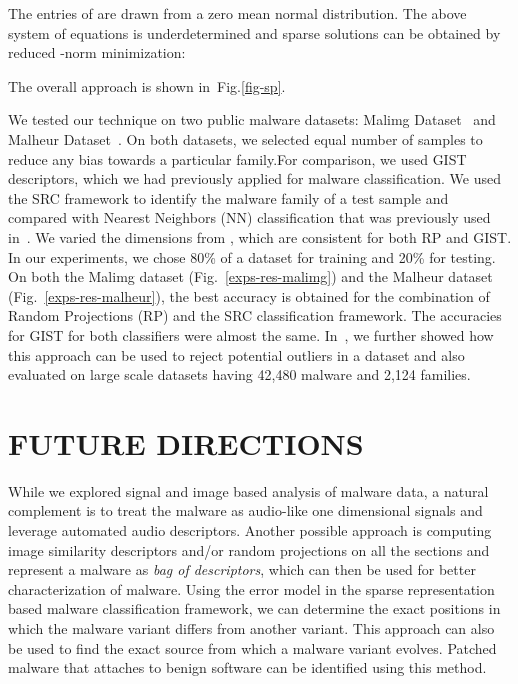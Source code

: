 \documentclass[journal]{IEEEtran}
\begin{document}
 
The entries of  are drawn from a zero mean normal distribution.
The above system of equations is underdetermined and sparse solutions can be obtained by reduced -norm minimization:


The overall approach is shown in~Fig.\ref{fig-sp}.



We tested our technique on two public malware datasets: Malimg Dataset~\cite{malimg-ds} and Malheur Dataset~\cite{malheur}.
On both datasets, we selected equal number of samples to reduce any bias towards a particular family.For comparison, we used GIST descriptors, which we had previously applied for malware classification.
We used the SRC framework to identify the malware family of a test sample and compared with Nearest Neighbors (NN) classification that was previously used in~\cite{malw-imgs}.
We varied the dimensions from , which are consistent for both RP and GIST.
In our experiments, we chose 80\% of a dataset for training and 20\% for testing. 
On both the Malimg dataset (Fig.~\ref{exps-res-malimg}) and the Malheur dataset (Fig.~\ref{exps-res-malheur}), the best accuracy is obtained for the combination of Random Projections (RP) and the SRC classification framework.
The accuracies for GIST for both classifiers were almost the same.
In~\cite{sattva}, we further showed how this approach can be used to reject potential outliers in a dataset and also evaluated on large scale datasets having 42,480 malware and 2,124 families.







\section*{FUTURE DIRECTIONS}
While we explored signal and image based analysis of malware data, a natural complement is to treat the malware as audio-like one dimensional signals and leverage automated audio descriptors.
Another possible approach is computing image similarity descriptors and/or random projections on all the sections and represent a malware as \emph{bag of descriptors}, which can then be used for better characterization of malware.
Using the error model in the sparse representation based malware classification framework, we can determine the exact positions in which the malware variant differs from another variant.
This approach can also be used to find the exact source from which a malware variant evolves.
Patched malware that attaches to benign software can be identified using this method.
\end{document}
